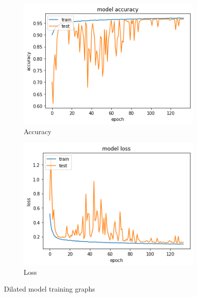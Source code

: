 \documentclass{article}
\begin{document}
\begin{figure}[H]
	\centering
	\begin{subfigure}{.5\textwidth}
		\centering
		\includegraphics[width=.95\linewidth]{./images/poly/dilated_acc.png}
		\caption{Accuracy}
	\end{subfigure}%
	\begin{subfigure}{.5\textwidth}
		\centering
		\includegraphics[width=.95\linewidth]{./images/poly/dilated_loss.png}
		\caption{Loss}
	\end{subfigure}
	\caption{Dilated model training graphs}
	\label{fig:poly_dil_result}
\end{figure}
\end{document}

